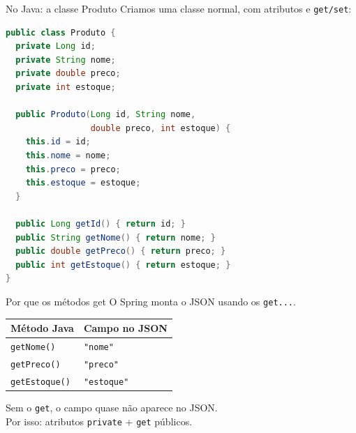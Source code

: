 \documentclass[aspectratio=169,11pt]{beamer}
\begin{document}
\begin{frame}[fragile]{No Java: a classe Produto}
  Criamos uma classe normal, com atributos e \texttt{get/set}:

\begin{lstlisting}[language=Java,basicstyle=\ttfamily\footnotesize]
public class Produto {
  private Long id;
  private String nome;
  private double preco;
  private int estoque;

  public Produto(Long id, String nome,
                 double preco, int estoque) {
    this.id = id;
    this.nome = nome;
    this.preco = preco;
    this.estoque = estoque;
  }

  public Long getId() { return id; }
  public String getNome() { return nome; }
  public double getPreco() { return preco; }
  public int getEstoque() { return estoque; }
}
\end{lstlisting}
\end{frame}

\begin{frame}[fragile]{Por que os métodos get}
  O Spring monta o JSON usando os \texttt{get...}.

  \vspace{0.4em}
  \begin{center}
  \begin{tabular}{ll}
    \toprule
    Método Java & Campo no JSON \\
    \midrule
    \texttt{getNome()} & \texttt{"nome"} \\
    \texttt{getPreco()} & \texttt{"preco"} \\
    \texttt{getEstoque()} & \texttt{"estoque"} \\
    \bottomrule
  \end{tabular}
  \end{center}

  \vspace{0.6em}
  Sem o \texttt{get}, o campo quase não aparece no JSON.\\
  Por isso: atributos \texttt{private} + \texttt{get} públicos.
\end{frame}
\end{document}
